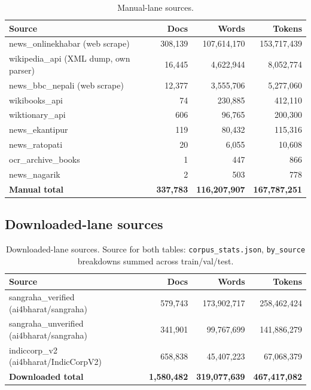 \documentclass[11pt]{article}
\begin{document}
\begin{table}[htbp]
\centering
\begin{tabular}{lrrr}
\toprule
Source & Docs & Words & Tokens \\
\midrule
news\_onlinekhabar (web scrape) & 308{,}139 & 107{,}614{,}170 & 153{,}717{,}439 \\
wikipedia\_api (XML dump, own parser) & 16{,}445 & 4{,}622{,}944 & 8{,}052{,}774 \\
news\_bbc\_nepali (web scrape) & 12{,}377 & 3{,}555{,}706 & 5{,}277{,}060 \\
wikibooks\_api & 74 & 230{,}885 & 412{,}110 \\
wiktionary\_api & 606 & 96{,}765 & 200{,}300 \\
news\_ekantipur & 119 & 80{,}432 & 115{,}316 \\
news\_ratopati & 20 & 6{,}055 & 10{,}608 \\
ocr\_archive\_books & 1 & 447 & 866 \\
news\_nagarik & 2 & 503 & 778 \\
\midrule
\textbf{Manual total} & \textbf{337{,}783} & \textbf{116{,}207{,}907} & \textbf{167{,}787{,}251} \\
\bottomrule
\end{tabular}
\caption{Manual-lane sources.}
\end{table}

\subsection*{Downloaded-lane sources}

\begin{table}[htbp]
\centering
\begin{tabular}{lrrr}
\toprule
Source & Docs & Words & Tokens \\
\midrule
sangraha\_verified (ai4bharat/sangraha) & 579{,}743 & 173{,}902{,}717 & 258{,}462{,}424 \\
sangraha\_unverified (ai4bharat/sangraha) & 341{,}901 & 99{,}767{,}699 & 141{,}886{,}279 \\
indiccorp\_v2 (ai4bharat/IndicCorpV2) & 658{,}838 & 45{,}407{,}223 & 67{,}068{,}379 \\
\midrule
\textbf{Downloaded total} & \textbf{1{,}580{,}482} & \textbf{319{,}077{,}639} & \textbf{467{,}417{,}082} \\
\bottomrule
\end{tabular}
\caption{Downloaded-lane sources. Source for both tables: \texttt{corpus\_stats.json}, \texttt{by\_source} breakdowns summed across train/val/test.}
\end{table}
\end{document}
